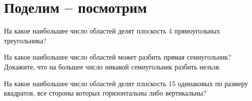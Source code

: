 \section{Поделим – посмотрим}
\begin{itemize}

\itA На какое наибольшее число областей делят плоскость 4 прямоугольных треугольника?

\itB На какое наибольшее число областей может разбить прямая семиугольник? Докажите, что на большее число никакой семиугольник разбить нельзя.

\itC На какое наибольшее число областей делят плоскость 15 одинаковых по размеру квадратов, все стороны которых горизонтальны либо вертикальны?
\end{itemize}